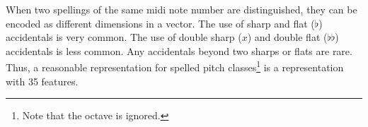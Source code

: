 
When two spellings of the same \gls{midi} note number are
distinguished, they can be encoded as different dimensions
in a vector. The use of sharp \musSharp{} and flat ($\flat$)
accidentals is very common. The use of double sharp ($x$)
and double flat ($\flat\flat$) accidentals is less common.
Any accidentals beyond two sharps or flats are rare. Thus, a
reasonable representation for spelled pitch
classes\footnote{Note that the octave is ignored.} is a
representation with 35 features.
